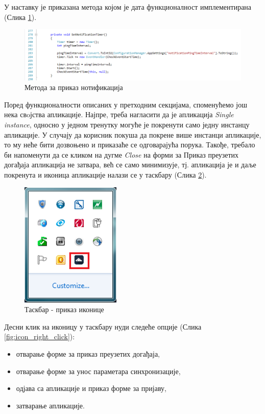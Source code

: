 У наставку је приказана метода којом је дата функционалност имплементирана  (Слика \ref{fig:set_notification_timer}).

\begin{figure}[H]
	\centering
	\includegraphics[scale=0.5]{slike/SetNotificationTimer.png}
	\caption{Метода за приказ нотификација}
	\label{fig:set_notification_timer}
\end{figure}

Поред функционалности описаних у претходним секцијама, споменућемо још нека свoјства апликације. Најпре, треба нагласити да је апликација \textit{Single instance}, односно у једном тренутку могуће је покренути само једну инстанцу апликације. У случају да корисник покуша да покрене више инстанци апликације, то му неће бити дозвоњено и приказаће се одговарајућа порука. 
Такође, требало би напоменути да се кликом на дугме \textit{Close} на форми за Приказ преузетих догађаја апликација не затвара, већ се само минимизује, тј. апликација је и даље покренута и иконица апликације налази се у таскбару (Слика \ref{fig:application_icon}).

\begin{figure}[H]
	\centering
	\includegraphics[scale=0.5]{slike/ApplicationIcon.png}
	\caption{Таскбар - приказ иконице}
	\label{fig:application_icon}
\end{figure}

Десни клик на иконицу у таскбару нуди следеће опције (Слика \ref{fig:icon_right_click}):
\begin{itemize}
	\item{отварање форме за приказ преузетих догађаја},
	\item{отварање форме за унос параметара синхронизације},
	\item{одјава са апликације и приказ форме за пријаву},
	\item{затварање апликације}.
\end{itemize}

